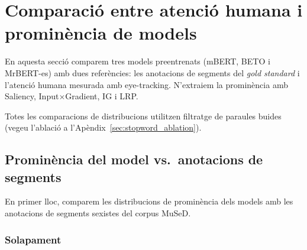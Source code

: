\section{Comparació entre atenció humana i prominència de models}

En aquesta secció comparem tres models preentrenats (mBERT, BETO i MrBERT-es) amb dues referències: les anotacions de segments del \textit{gold standard} i l'atenció humana mesurada amb eye-tracking.
N'extraiem la prominència amb Saliency, Input$\times$Gradient, IG i LRP.

Totes les comparacions de distribucions utilitzen filtratge de paraules buides (vegeu l'ablació a l'Apèndix~\ref{sec:stopword_ablation}).

\subsection{Prominència del model vs.\ anotacions de segments}

En primer lloc, comparem les distribucions de prominència dels models amb les anotacions de segments sexistes del corpus MuSeD.

\subsubsection{Solapament}

